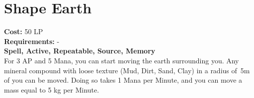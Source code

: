 \section{Shape Earth}\label{spell:shapeEarth}
\textbf{Cost:} 50 LP\\
\textbf{Requirements:} -\\
\textbf{Spell, Active, Repeatable, Source, Memory}\\
For 3 AP and 5 Mana, you can start moving the earth surrounding you.
Any mineral compound with loose texture (Mud, Dirt, Sand, Clay) in a radius of~5m of you can be moved.
Doing so takes 1 Mana per Minute, and you can move a mass equal to 5 kg per Minute.